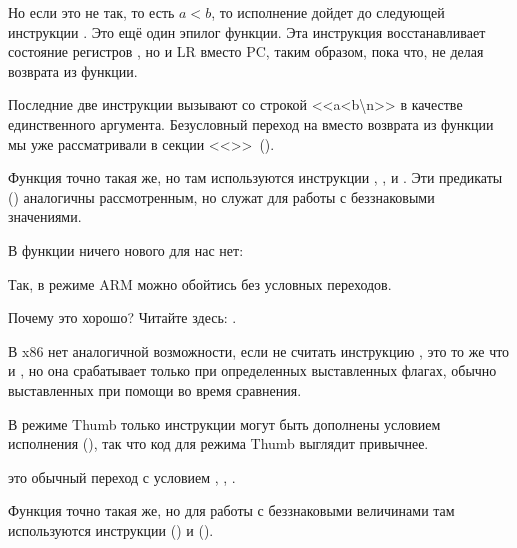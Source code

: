 Но если это не так, то есть $a<b$, то исполнение дойдет до следующей инструкции 
. Это ещё один эпилог функции. Эта инструкция восстанавливает состояние регистров
, но и \ac{LR} вместо \ac{PC}, таким образом, пока что, не делая возврата из функции.

Последние две инструкции вызывают \printf 
со строкой <<a<b\textbackslash{}n>> в качестве единственного аргумента.
Безусловный переход на \printf вместо возврата из функции мы уже рассматривали в секции
 <<\PrintfSeveralArgumentsSectionName>>~().

Функция  точно такая же, но там используются инструкции , , и . Эти предикаты
()
аналогичны рассмотренным, но служат для работы с беззнаковыми значениями.

В функции \main ничего нового для нас нет:



Так, в режиме ARM можно обойтись без условных переходов.

Почему это хорошо? Читайте здесь: .

В x86 нет аналогичной возможности, если не считать инструкцию , это то же что и \MOV, 
но она срабатывает только при определенных выставленных флагах, обычно выставленных при помощи \CMP во время сравнения.

\mysubparagraph{\OptimizingKeilVI (\ThumbMode)}



В режиме Thumb только инструкции  могут быть дополнены условием исполнения (), 
так что код для режима Thumb выглядит привычнее.

 это обычный переход с условием , 
\EMDASH{}, 
\EMDASH{}.

Функция  точно такая же, но для работы с беззнаковыми величинами 
там используются инструкции  
() и  ().
